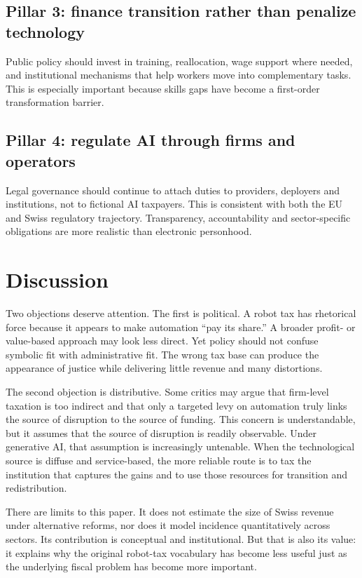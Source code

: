 \documentclass[11pt]{article}
\begin{document}
\subsection{Pillar 3: finance transition rather than penalize technology}
Public policy should invest in training, reallocation, wage support where needed, and institutional mechanisms that help workers move into complementary tasks. This is especially important because skills gaps have become a first-order transformation barrier.

\subsection{Pillar 4: regulate AI through firms and operators}
Legal governance should continue to attach duties to providers, deployers and institutions, not to fictional AI taxpayers. This is consistent with both the EU and Swiss regulatory trajectory. Transparency, accountability and sector-specific obligations are more realistic than electronic personhood.

\section{Discussion}
Two objections deserve attention. The first is political. A robot tax has rhetorical force because it appears to make automation ``pay its share.'' A broader profit- or value-based approach may look less direct. Yet policy should not confuse symbolic fit with administrative fit. The wrong tax base can produce the appearance of justice while delivering little revenue and many distortions.

The second objection is distributive. Some critics may argue that firm-level taxation is too indirect and that only a targeted levy on automation truly links the source of disruption to the source of funding. This concern is understandable, but it assumes that the source of disruption is readily observable. Under generative AI, that assumption is increasingly untenable. When the technological source is diffuse and service-based, the more reliable route is to tax the institution that captures the gains and to use those resources for transition and redistribution.

There are limits to this paper. It does not estimate the size of Swiss revenue under alternative reforms, nor does it model incidence quantitatively across sectors. Its contribution is conceptual and institutional. But that is also its value: it explains why the original robot-tax vocabulary has become less useful just as the underlying fiscal problem has become more important.
\end{document}
